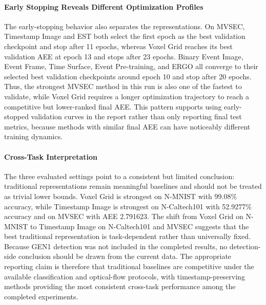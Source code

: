 \documentclass[11pt]{article}
\begin{document}
\paragraph{Early Stopping Reveals Different Optimization Profiles} The early-stopping behavior also separates the representations. On MVSEC, Timestamp Image and EST both select the first epoch as the best validation checkpoint and stop after 11 epochs, whereas Voxel Grid reaches its best validation AEE at epoch 13 and stops after 23 epochs. Binary Event Image, Event Frame, Time Surface, Event Pre-training, and ERGO all converge to their selected best validation checkpoints around epoch 10 and stop after 20 epochs. Thus, the strongest MVSEC method in this run is also one of the fastest to validate, while Voxel Grid requires a longer optimization trajectory to reach a competitive but lower-ranked final AEE. This pattern supports using early-stopped validation curves in the report rather than only reporting final test metrics, because methods with similar final AEE can have noticeably different training dynamics.

\paragraph{Cross-Task Interpretation} The three evaluated settings point to a consistent but limited conclusion: traditional representations remain meaningful baselines and should not be treated as trivial lower bounds. Voxel Grid is strongest on N-MNIST with 99.08\% accuracy, while Timestamp Image is strongest on N-Caltech101 with 52.9277\% accuracy and on MVSEC with AEE 2.791623. The shift from Voxel Grid on N-MNIST to Timestamp Image on N-Caltech101 and MVSEC suggests that the best traditional representation is task-dependent rather than universally fixed. Because GEN1 detection was not included in the completed results, no detection-side conclusion should be drawn from the current data. The appropriate reporting claim is therefore that traditional baselines are competitive under the available classification and optical-flow protocols, with timestamp-preserving methods providing the most consistent cross-task performance among the completed experiments.
\end{document}
